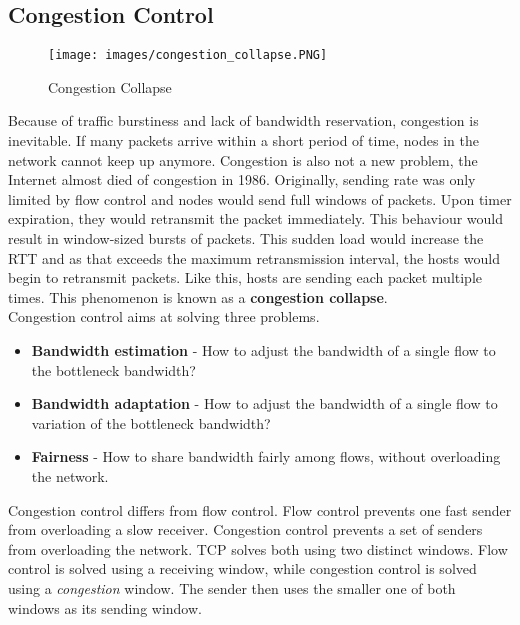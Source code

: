 \subsection{Congestion Control}
\begin{wrapfigure}{r}{.4\textwidth}
\centering
\texttt{[image: images/congestion\_collapse.PNG]}
\caption{Congestion Collapse}
\label{congestion_collapse}
\end{wrapfigure}
Because of traffic burstiness and lack of bandwidth reservation, congestion is inevitable. If many packets arrive within a short period of time, nodes in the network cannot keep up anymore. Congestion is also not a new problem, the Internet almost died of congestion in 1986. Originally, sending rate was only limited by flow control and nodes would send full windows of packets. Upon timer expiration, they would retransmit the packet immediately. This behaviour would result in window-sized bursts of packets. This sudden load would increase the RTT and as that exceeds the maximum retransmission interval, the hosts would begin to retransmit packets. Like this, hosts are sending each packet multiple times. This phenomenon is known as a \textbf{congestion collapse}. \vspace{.3cm}\\
Congestion control aims at solving three problems.
\begin{itemize}
\item \textbf{Bandwidth estimation} - How to adjust the bandwidth of a single flow to the bottleneck bandwidth?
\item \textbf{Bandwidth adaptation} - How to adjust the bandwidth of a single flow to variation of the bottleneck bandwidth?
\item \textbf{Fairness} - How to share bandwidth fairly among flows, without overloading the network.
\end{itemize}
Congestion control differs from flow control. Flow control prevents one fast sender from overloading a slow receiver. Congestion control prevents a set of senders from overloading the network. TCP solves both using two distinct windows. Flow control is solved using a receiving window, while congestion control is solved using a \textit{congestion} window. The sender then uses the smaller one of both windows as its sending window.

